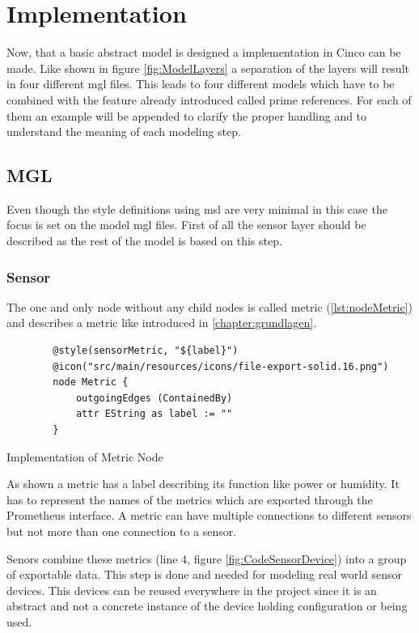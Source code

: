 \chapter{Implementation}
\label{chapter:realisierung}
Now, that a basic abstract model is designed a implementation in Cinco can be made. Like shown in figure \ref{fig:ModelLayers} a separation of the layers will result in four different \gls{mgl} files. This leads to four different models which have to be combined with the feature already introduced called prime references. For each of them an example will be appended to clarify the proper handling and to understand the meaning of each modeling step.

\section{MGL}
\label{sec:mgl}
Even though the style definitions using \gls{msl} are very minimal in this case the focus is set on the model \gls{mgl} files.
First of all the sensor layer should be described as the rest of the model is based on this step.
\subsection{Sensor}
The one and only node without any child nodes is called metric (\cref{lst:nodeMetric}) and describes a metric like introduced in \cref{chapter:grundlagen}. 
\begin{listing}[H]
	\begin{verbatim}
		@style(sensorMetric, "${label}")
		@icon("src/main/resources/icons/file-export-solid.16.png")
		node Metric {
			outgoingEdges (ContainedBy)
			attr EString as label := ""
		}
	\end{verbatim}
	\caption{Implementation of Metric Node}
	\label{lst:nodeMetric}
\end{listing}
As shown a metric has a label describing its function like power or humidity. It has to represent the names of the metrics which are exported through the Prometheus interface. A metric can have multiple connections to different sensors but not more than one connection to a sensor.

Senors combine these metrics (line 4, figure \ref{fig:CodeSensorDevice}) into a group of exportable data. This step is done and needed for modeling real world sensor devices. This devices can be reused everywhere in the project since it is an abstract and not a concrete instance of the device holding configuration or being used. 

